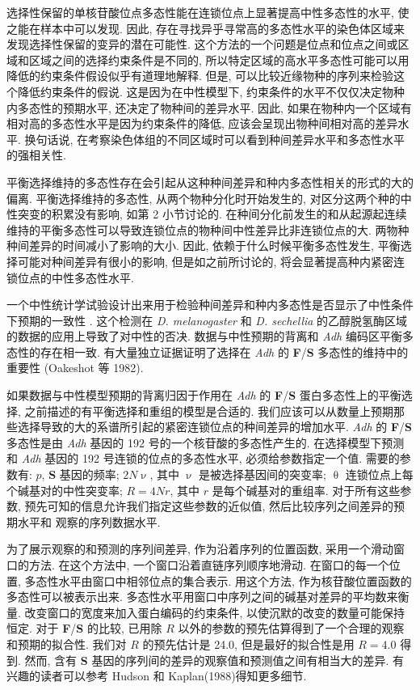 \documentclass[12pt]{article}
\begin{document}
选择性保留的单核苷酸位点多态性能在连锁位点上显著提高中性多态性的水平, 使之能在样本中可以发现.
因此, 存在寻找异乎寻常高的多态性水平的染色体区域来发现选择性保留的变异的潜在可能性.
这个方法的一个问题是位点和位点之间或区域和区域之间的选择约束条件是不同的,
所以特定区域的高水平多态性可能可以用降低的约束条件假设似乎有道理地解释.
但是, 可以比较近缘物种的序列来检验这个降低约束条件的假说.
这是因为在中性模型下, 约束条件的水平不仅仅决定物种内多态性的预期水平, 还决定了物种间的差异水平.
因此, 如果在物种内一个区域有相对高的多态性水平是因为约束条件的降低, 应该会呈现出物种间相对高的差异水平.
换句话说, 在考察染色体组的不同区域时可以看到种间差异水平和多态性水平的强相关性.

平衡选择维持的多态性存在会引起从这种种间差异和种内多态性相关的形式的大的偏离.
平衡选择维持的多态性, 从两个物种分化时开始发生的, 对区分这两个种的中性突变的积累没有影响, 如第 2 小节讨论的.
在种间分化前发生的和从起源起连续维持的平衡多态性可以导致连锁位点的物种间中性差异比非连锁位点的大.
两物种种间差异的时间减小了影响的大小.
因此, 依赖于什么时候平衡多态性发生, 平衡选择可能对种间差异有很小的影响, 但是如之前所讨论的,
将会显著提高种内紧密连锁位点的中性多态性水平.

一个中性统计学试验设计出来用于检验种间差异和种内多态性是否显示了中性条件下预期的一致性 \parencite{hudson1987, kreitman1986}.
这个检测在 \textit{D. melanogaster} 和 \textit{D. sechellia} 的乙醇脱氢酶区域的数据的应用上导致了对中性的否决.
数据与中性预期的背离和 \textit{Adh} 编码区平衡多态性的存在相一致.
有大量独立证据证明了选择在 \textit{Adh} 的 \textbf{F}/\textbf{S} 多态性的维持中的重要性 (Oakeshot 等 1982).

如果数据与中性模型预期的背离归因于作用在 \textit{Adh} 的 \textbf{F}/\textbf{S} 蛋白多态性上的平衡选择,
之前描述的有平衡选择和重组的模型是合适的.
我们应该可以从数量上预期那些选择导致的大的系谱所引起的紧密连锁位点的种间差异的增加水平.
\textit{Adh} 的 \textbf{F}/\textbf{S} 多态性是由 \textit{Adh} 基因的 192 号的一个核苷酸的多态性产生的.
在选择模型下预测和 \textit{Adh} 基因的 192 号连锁的位点的多态性水平, 必须给参数指定一个值.
需要的参数有: $p$, \textbf{S} 基因的频率; $2N\upnu$, 其中 $\upnu$ 是被选择基因间的突变率;
$\uptheta$ 连锁位点上每个碱基对的中性突变率; $R=4Nr$, 其中 $r$ 是每个碱基对的重组率.
对于所有这些参数, 预先可知的信息允许我们指定这些参数的近似值,
然后比较序列之间差异的预期水平和 \textcite{kreitman1983a} 观察的序列数据水平.

为了展示观察的和预测的序列间差异, 作为沿着序列的位置函数, 采用一个滑动窗口的方法. 在这个方法中,
一个窗口沿着直链序列顺序地滑动. 在窗口的每一个位置, 多态性水平由窗口中相邻位点的集合表示. 用这个方法,
作为核苷酸位置函数的多态性可以被表示出来. 多态性水平用窗口中序列之间的碱基对差异的平均数来衡量.
改变窗口的宽度来加入蛋白编码的约束条件, 以使沉默的改变的数量可能保持恒定. 对于 \textbf{F}/\textbf{S} 的比较, 已用除 $R$
以外的参数的预先估算得到了一个合理的观察和预期的拟合性. 我们对 $R$ 的预先估计是 24.0, 但是最好的拟合性是用 $R=4.0$
得到. 然而, 含有 \textbf{S} 基因的序列间的差异的观察值和预测值之间有相当大的差异. 有兴趣的读者可以参考 Hudson 和
Kaplan(1988)得知更多细节.
\end{document}
